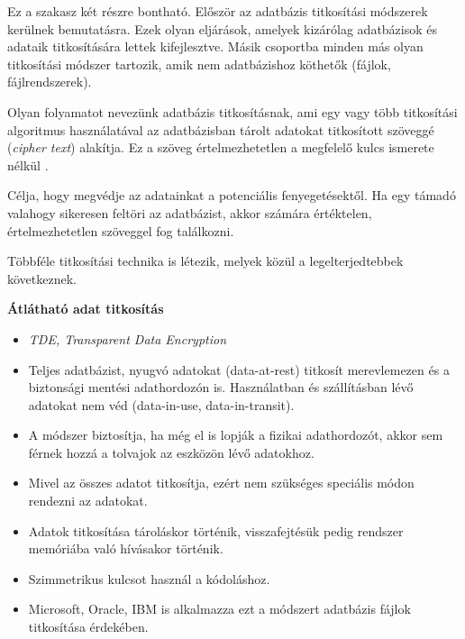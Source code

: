 
Ez a szakasz két részre bontható. Először az adatbázis titkosítási módszerek kerülnek bemutatásra. Ezek olyan  eljárások, amelyek kizárólag adatbázisok és adataik titkosítására lettek kifejlesztve. Másik csoportba minden más olyan titkosítási módszer tartozik, amik nem adatbázishoz köthetők (fájlok, fájlrendszerek).


Olyan folyamatot nevezünk adatbázis titkosításnak, ami egy vagy több titkosítási algoritmus használatával az adatbázisban tárolt adatokat titkosított szöveggé (\textit{cipher text}) alakítja. Ez a szöveg értelmezhetetlen a megfelelő kulcs ismerete nélkül \cite{bouganim2009database}.

Célja, hogy megvédje az adatainkat a potenciális fenyegetésektől. Ha egy támadó valahogy sikeresen feltöri az adatbázist, akkor számára értéktelen, értelmezhetetlen szöveggel fog találkozni.

Többféle titkosítási technika is létezik, melyek közül a legelterjedtebbek következnek.

\bigskip


\noindent\textbf{Átlátható adat titkosítás}
\begin{itemize}
	\item \textit{TDE, Transparent Data Encryption}
	\item Teljes adatbázist, nyugvó adatokat (data-at-rest) titkosít merevlemezen és a biztonsági mentési adathordozón is. Használatban és szállításban lévő adatokat nem véd (data-in-use, data-in-transit).
	\item A módszer biztosítja, ha még el is lopják a fizikai adathordozót, akkor sem férnek hozzá a tolvajok az eszközön lévő adatokhoz.
	\item Mivel az összes adatot titkosítja, ezért nem szükséges speciális módon rendezni az adatokat.
	\item Adatok titkosítása tároláskor történik, visszafejtésük pedig rendszer memóriába való hívásakor történik.
	\item Szimmetrikus kulcsot használ a kódoláshoz.
	\item Microsoft, Oracle, IBM is alkalmazza ezt a módszert adatbázis fájlok titkosítása érdekében.
\end{itemize}

